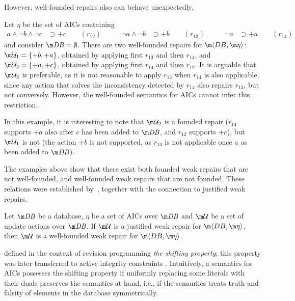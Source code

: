 However, well-founded repairs also can behave unexpectedly.
\begin{example}
  \label{ex:well-founded}
  Let $\eta$ be the set of AICs containing
  \begin{align*}
  a\land\neg b\land\neg c &\supset{+c} \qquad (r_{12}) \qquad &
  \neg a\land\neg b &\supset{+b} \qquad (r_{13}) \qquad &
  \neg a &\supset{+a} \qquad (r_{14})
  \end{align*}
  and consider $\db=\emptyset$.
  There are two well-founded repairs for $\fulldb$: $\UU_1=\{{+b},{+a}\}$, obtained by applying first $r_{13}$ and then $r_{14}$, and $\UU_2=\{{+a},{+c}\}$, obtained by applying first $r_{14}$ and then $r_{12}$.
  It is arguable that $\UU_2$ is preferable, as it is not reasonable to apply $r_{13}$ when $r_{14}$ is also applicable, since any action that solves the inconsistency detected by $r_{14}$ also repairs $r_{13}$, but not conversely.
  However, the well-founded semantics for AICs cannot infer this restriction.
\end{example}
In this example, it is interesting to note that $\UU_2$ is a founded repair ($r_{14}$ supports ${+a}$ also after $c$ has been added to $\db$, and $r_{12}$ supports ${+c}$), but $\UU_1$ is not (the action ${+b}$ is not supported, as $r_{13}$ is not applicable once $a$ as been added to $\db$).

The examples above show that there exist both founded weak repairs that are not well-founded, and well-founded weak repairs that are not founded.
These relations were established by~\cite{tase/Cruz-FilipeEGN13}, together with the connection to justified weak repairs.
\begin{lemma}
  \label{lem:justified-wf}
  Let $\db$ be a database, $\eta$ be a set of AICs over $\db$ and $\UU$ be a set of update actions over $\db$.
  If $\UU$ is a justified weak repair for $\fulldb$, then $\UU$ is a well-founded weak repair for $\fulldb$.
\end{lemma}

\citet{tcs/MarekT98} defined in the context of revision programming \emph{the shifting property}; this property was later transferred to active integrity constraints \cite{tplp/CaropreseT11}. 
Intuitively, a semantics for AICs possesses the shifting property if uniformly replacing some literals with their duals
preserves the semantics at hand, i.e., if the semantics treats truth and falsity of elements in the database symmetrically.

